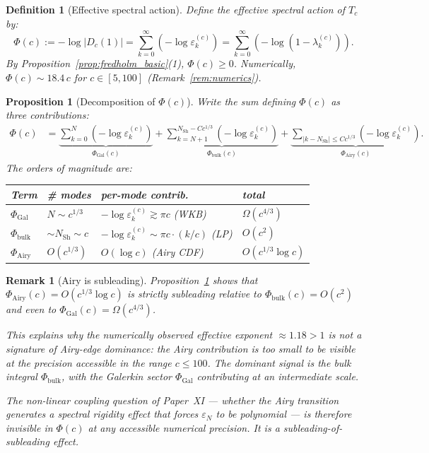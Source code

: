 \documentclass[12pt,a4paper]{article}
\newtheorem{proposition}[theorem]{Proposition}
\newtheorem{definition}[theorem]{Definition}
\newtheorem{remark}[theorem]{Remark}
\newcommand{\lam}[1]{\lambda_{#1}^{(c)}}
\newcommand{\eps}[1]{\varepsilon_{#1}^{(c)}}
\newcommand{\Tc}{T_c}
\newcommand{\Dc}{D_c}
\begin{document}
\begin{definition}[Effective spectral action]
\label{def:phi}
Define the \emph{effective spectral action} of $\Tc$ by:
\[
  \Phi(c) := -\log |\Dc(1)|
  = \sum_{k=0}^\infty (-\log \eps{k})
  = \sum_{k=0}^\infty (-\log(1 - \lam{k})).
\]
By Proposition~\ref{prop:fredholm_basic}(1),
$\Phi(c) \geq 0$.
Numerically, $\Phi(c) \sim 18.4\, c$ for $c \in [5,100]$
(Remark~\ref{rem:numerics}).
\end{definition}

\begin{proposition}[Decomposition of $\Phi(c)$]
\label{prop:phi_decomp}
Write the sum defining $\Phi(c)$ as three contributions:
\begin{align*}
  \Phi(c)
  &= \underbrace{\sum_{k=0}^{N} (-\log \eps{k})}_{\Phi_{\mathrm{Gal}}(c)}
  + \underbrace{\sum_{k=N+1}^{N_{\mathrm{Sh}} - Cc^{1/3}}
    (-\log \eps{k})}_{\Phi_{\mathrm{bulk}}(c)}
  + \underbrace{\sum_{|k - N_{\mathrm{Sh}}| \leq Cc^{1/3}}
    (-\log \eps{k})}_{\Phi_{\mathrm{Airy}}(c)}.
\end{align*}
The orders of magnitude are:
\begin{center}
\renewcommand{\arraystretch}{1.4}
\begin{tabular}{llll}
\toprule
Term & \# modes & per-mode contrib. & total \\
\midrule
$\Phi_{\mathrm{Gal}}$ & $N \sim c^{1/3}$
  & $-\log\eps{k} \gtrsim \pi c$ (WKB)
  & $\Omega(c^{4/3})$ \\
$\Phi_{\mathrm{bulk}}$ & $\sim N_{\mathrm{Sh}} \sim c$
  & $-\log\eps{k} \sim \pi c \cdot (k/c)$ (LP)
  & $O(c^2)$ \\
$\Phi_{\mathrm{Airy}}$ & $O(c^{1/3})$
  & $O(\log c)$ (Airy CDF)
  & $O(c^{1/3} \log c)$ \\
\bottomrule
\end{tabular}
\end{center}
\end{proposition}

\begin{remark}[Airy is subleading]
\label{rem:airy_subleading}
Proposition~\ref{prop:phi_decomp} shows that
$\Phi_{\mathrm{Airy}}(c) = O(c^{1/3} \log c)$
is strictly subleading relative to
$\Phi_{\mathrm{bulk}}(c) = O(c^2)$
and even to $\Phi_{\mathrm{Gal}}(c) = \Omega(c^{4/3})$.

\medskip\noindent
This explains why the numerically observed effective
exponent $\approx 1.18 > 1$ is \emph{not} a signature
of Airy-edge dominance:
the Airy contribution is too small to be visible
at the precision accessible in the range $c \leq 100$.
The dominant signal is the bulk integral
$\Phi_{\mathrm{bulk}}$, with the Galerkin sector
$\Phi_{\mathrm{Gal}}$ contributing at an
intermediate scale.

\medskip\noindent
The non-linear coupling question of Paper~XI ---
whether the Airy transition generates a
spectral rigidity effect that forces $\varepsilon_N$
to be polynomial --- is therefore \emph{invisible}
in $\Phi(c)$ at any accessible numerical precision.
It is a subleading-of-subleading effect.
\end{remark}
\end{document}
